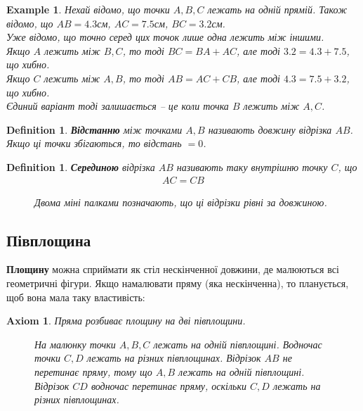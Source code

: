 \documentclass[a4paper, 10pt]{article}
\theoremstyle{theoremdd}
\theoremstyle{theoremdd}
\newtheorem{axiom}{Axiom}
\theoremstyle{theoremdd}
\newtheorem{definition}[theorem]{Definition}
\theoremstyle{theoremdd}
\theoremstyle{theoremdd}
\newtheorem{example}[theorem]{Example}
\theoremstyle{theoremdd}
\theoremstyle{theoremdd}
\theoremstyle{theoremdd}
\theoremstyle{theoremdd}
\begin{document}
\begin{example}
Нехай відомо, що точки $A,B,C$ лежать на одній прямій. Також відомо, що $AB = 4.3$см, $AC=7.5$см, $BC = 3.2$см.\\
Уже відомо, що точно серед цих точок лише одна лежить між іншими.\\
Якщо $A$ лежить між $B,C$, то тоді $BC = BA + AC$, але тоді $3.2 = 4.3 + 7.5$, що хибно.\\
Якщо $C$ лежить між $A,B$, то тоді $AB = AC + CB$, але тоді $4.3 = 7.5 + 3.2$, що хибно.\\
Єдиний варіант тоді залишається -- це коли точка $B$ лежить між $A,C$.
\end{example}

\begin{definition}
\textbf{Відстанню} між точками $A,B$ називають довжину відрізка $AB$.\\
Якщо ці точки збігаються, то відстань $= 0$.
\end{definition}

\begin{definition}
\textbf{Серединою} відрізка $AB$ називають таку внутрішню точку $C$, що
\begin{align*}
AC = CB
\end{align*}
\begin{figure}[H]
\centering
{}
\caption*{Двома міні палками позначають, що ці відрізки рівні за довжиною.}
\end{figure}
\end{definition}

\subsection{Півплощина}
\textbf{Площину} можна сприймати як стіл нескінченної довжини, де малюються всі геометричні фігури. Якщо намалювати пряму (яка нескінченна), то планується, щоб вона мала таку властивість:
\begin{axiom}
Пряма розбиває площину на дві півплощини.
\begin{figure}[H]
\centering
{}
\caption*{На малюнку точки $A,B,C$ лежать на одній півплощині. Водночас точки $C,D$ лежать на різних півплощинах. Відрізок $AB$ не перетинає пряму, тому що $A,B$ лежать на одній півплощині. Відрізок $CD$ водночас перетинає пряму, оскільки $C,D$ лежать на різних півплощинах.}
\end{figure}
\end{axiom}
\end{document}

